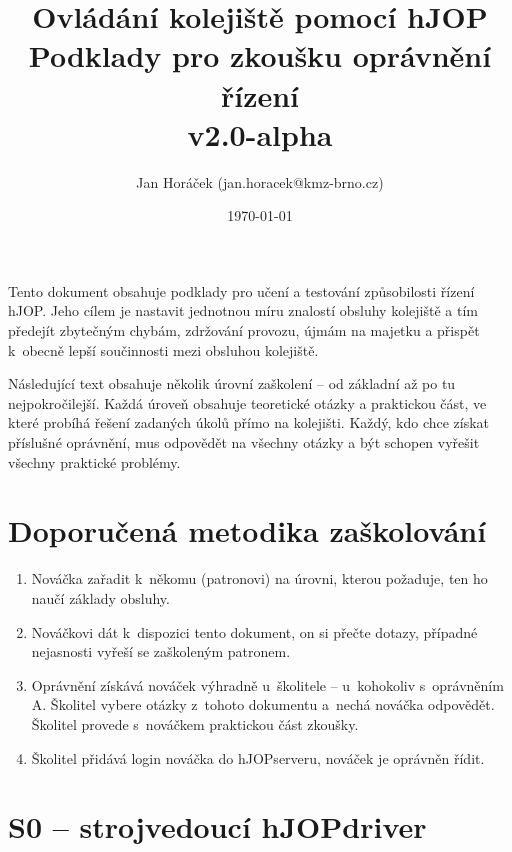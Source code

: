 \documentclass[12pt,a4paper]{article}
\begin{document}
\thispagestyle{empty}

\setlength{\parindent}{0cm}
\setlength{\parskip}{1mm plus2pt minus1pt}

\setlength{\droptitle}{-5em}

\title{
\Large Ovládání kolejiště pomocí hJOP\\
\LARGE Podklady pro zkoušku oprávnění řízení\\
\small v2.0-alpha}
\author{Jan Horáček (jan.horacek@kmz-brno.cz)}
\date{\today}
\maketitle

Tento dokument obsahuje podklady pro učení a testování způsobilosti řízení
hJOP. Jeho cílem je nastavit jednotnou míru znalostí obsluhy kolejiště a tím
předejít zbytečným chybám, zdržování provozu, újmám na majetku a přispět
k~obecně lepší součinnosti mezi obsluhou kolejiště.

Následující text obsahuje několik úrovní zaškolení – od základní až po tu
nejpokročilejší. Každá úroveň obsahuje teoretické otázky a praktickou část, ve
které probíhá řešení zadaných úkolů přímo na kolejišti. Každý, kdo chce získat
příslušné oprávnění, mus odpovědět na všechny otázky a být schopen vyřešit
všechny praktické problémy.

\section{Doporučená metodika zaškolování}

\begin{enumerate}[leftmargin=*]
\item Nováčka zařadit k~někomu (patronovi) na úrovni, kterou požaduje, ten ho
naučí základy obsluhy.
\item Nováčkovi dát k~dispozici tento dokument, on si přečte dotazy, případné
nejasnosti vyřeší se zaškoleným patronem.
\item Oprávnění získává nováček výhradně u~školitele – u~kohokoliv s~oprávněním
A. Školitel vybere otázky z~tohoto dokumentu a~nechá nováčka odpovědět. Školitel
provede s~no\-váč\-kem praktickou část zkoušky.
\item Školitel přidává login nováčka do hJOPserveru, nováček je oprávněn řídit.
\end{enumerate}

\newpage

\section{S0 – strojvedoucí hJOPdriver}
\end{document}
